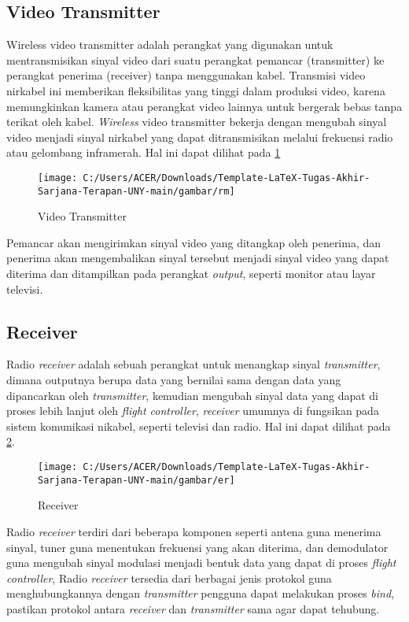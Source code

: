 \subsection{Video Transmitter}
Wireless video transmitter adalah perangkat yang digunakan untuk mentransmisikan sinyal video dari suatu perangkat pemancar (transmitter) ke
perangkat penerima (receiver) tanpa menggunakan kabel\cite{widyanto2019sistem}.
Transmisi video nirkabel ini memberikan fleksibilitas yang tinggi dalam produksi video, karena memungkinkan kamera atau perangkat video lainnya untuk bergerak bebas tanpa terikat oleh kabel. \textit{Wireless} video transmitter bekerja dengan mengubah sinyal video menjadi sinyal nirkabel yang dapat ditransmisikan melalui frekuensi radio atau gelombang inframerah. Hal ini dapat dilihat pada \cref{fig:rm}

\begin{figure}[H]
	\centering
	\texttt{[image: C:/Users/ACER/Downloads/Template-LaTeX-Tugas-Akhir-Sarjana-Terapan-UNY-main/gambar/rm]}
	\caption{Video Transmitter}
	\label{fig:rm}
\end{figure}

Pemancar akan mengirimkan sinyal video yang ditangkap oleh penerima, dan penerima akan mengembalikan sinyal tersebut menjadi sinyal video yang dapat diterima dan ditampilkan pada perangkat  \textit{output}, seperti monitor atau layar televisi.

\subsection{Receiver}
Radio \textit{receiver} adalah sebuah perangkat untuk menangkap sinyal \textit{transmitter}, dimana outputnya berupa data yang bernilai sama dengan data yang dipancarkan oleh \textit{transmitter}\cite{tohari2014fungsi}, kemudian mengubah sinyal data yang dapat di proses lebih lanjut oleh \textit{flight controller}, \textit{receiver} umumnya di fungsikan pada sistem komunikasi nikabel, seperti televisi dan radio. Hal ini dapat dilihat pada \cref{fig:er}.

\begin{figure}[H]
	\centering
	\texttt{[image: C:/Users/ACER/Downloads/Template-LaTeX-Tugas-Akhir-Sarjana-Terapan-UNY-main/gambar/er]}
	\caption{Receiver}
	\label{fig:er}
\end{figure}


Radio \textit{receiver} terdiri dari beberapa komponen seperti antena guna menerima sinyal, tuner guna menentukan frekuensi yang akan diterima, dan demodulator guna mengubah sinyal modulasi menjadi bentuk data yang dapat di proses \textit{flight controller}, Radio \textit{receiver} tersedia dari berbagai jenis protokol guna menghubungkannya dengan \textit{transmitter} pengguna dapat melakukan proses \textit{bind}, pastikan protokol antara \textit{receiver} dan \textit{transmitter} sama agar dapat tehubung.

